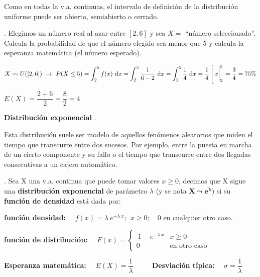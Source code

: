 Como en todas la v.a. continuas, el intervalo de definición de la distribución uniforme puede ser abierto, semiabierto o cerrado.

\vspace{4mm}
\begin{example}
. 	Elegimos un número real al azar entre $[2,6]$ y sea $X=$ ``número seleccionado''. Calcula la probabilidad de que el número elegido sea menor que 5 y calcula la esperanza matemática (el número esperado).

\vspace{2mm} 
\begin{small}
$X\leadsto U([2,6]) \ \to \ P(X\le 5)=\displaystyle \int_2^5 f(x)\ \dd x= \int_2^5 \dfrac 1{6-2}\ \dd x=\int_2^5 \dfrac 1 4 \ \dd x=\dfrac 1 4 \left[ \eval{ x}_2^5 \right.=\dfrac 3 4 = 75\%$

$E(X)= \dfrac{2+6}{2}=\dfrac 8 2 = 4$
\end{small}
\end{example}


\vspace{5mm} \textbf{\large{Distribución exponencial}} \normalsize{.}


Esta distribución suele ser modelo de aquellos fenómenos aleatorios que miden el tiempo que transcurre entre dos sucesos. Por ejemplo, entre la puesta en marcha de un cierto componente y su fallo o el tiempo que transcurre entre dos llegadas consecutivas a un cajero automático.

\vspace{4mm}
\begin{definition}
.	Sea X una v.a. continua que puede tomar valores $x \ge 0$, decimos que X sigue una \textbf{distribución exponencial} de {parámetro $\lambda$} (y se nota $\boldsymbol{X \leadsto e^{\lambda}}$) si su \textbf{función de densidad} está dada por:

\vspace{2mm} \textbf{función densidad:} $\quad f(x)=\lambda \ e^{-\lambda \ x};\ \ x\ge 0; \quad 0$ en cualquier otro caso.

\vspace{2mm} \textbf{función de distribución:} $\quad F(x)=\begin{cases}
\ 1-e^{-\lambda \ x} & x\ge 0 \\ 0 & \text{en otro caso}	
\end{cases}$

\vspace{2mm} \textbf{Esperanza matemática:} $\quad E(X)=\dfrac 1 \lambda$
$\qquad$ \textbf{Desviación típica:} $\quad \sigma= \dfrac 1 \lambda$

\end{definition}

